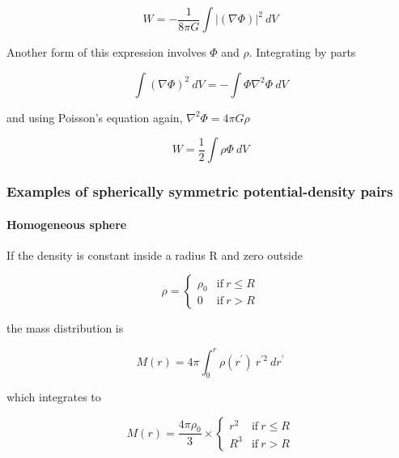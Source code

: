 \begin{equation}
 W =  - \frac{1}{8\pi G} \int \vert \left(\nabla \varPhi \right) \vert^2 \ dV 
\end{equation}


Another form of this expression involves $\varPhi$ and $\rho$. Integrating by parts 

\begin{equation}
\int  \left(\nabla \varPhi \right)^2  \ dV = -\int \varPhi \nabla^2 \varPhi \ dV
\end{equation}

and using Poisson's equation again, $\nabla^2\varPhi = 4\pi G \rho$

\begin{equation}
 W =  \frac{1}{2} \int \rho \varPhi \ dV 
\end{equation}


\subsubsection{Examples of spherically symmetric potential-density pairs}

\paragraph{Homogeneous sphere}

If the density is constant inside a radius R and zero outside 

\begin{equation}
\rho = \left\{ \begin{array}{cc} 
\rho_0 & \mathrm{if} \ r \leq R \\
0 & \mathrm{if} \ r > R
\end{array} \right.
\end{equation}

the mass distribution is 

\begin{equation}
M(r) =  4\pi \int_0^{r} \rho(r^\prime) \ r^{\prime 2} \ dr^\prime 
\end{equation}

which integrates to 

\begin{equation}
M(r) = \frac{4\pi \rho_0}{3}\times\left\{ \begin{array}{cc} 
r^2 & \mathrm{if} \ r \leq R \\
R^3 & \mathrm{if} \ r > R
\end{array} \right.
\end{equation}


